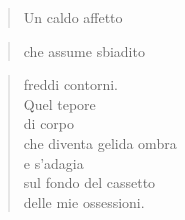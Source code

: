 
\begin{verse}

    Un caldo affetto\\
    \end{verse}
    \vspace{-0.9cm}
    \begin{verse}che assume \hfill sbiadito \end{verse}
    \vspace{-0.9cm}
    \begin{verse}
    freddi contorni.\\
    Quel tepore\\
    di corpo\\
    che diventa gelida ombra\\
    e s'adagia\\
    sul fondo del cassetto\\
    delle mie ossessioni.


\end{verse}
